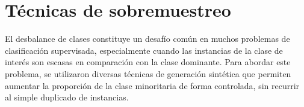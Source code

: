 \section{Técnicas de sobremuestreo}

El desbalance de clases constituye un desafío común en muchos problemas de clasificación supervisada, especialmente cuando las instancias de la clase de interés son escasas en comparación con la clase dominante. Para abordar este problema, se utilizaron diversas técnicas de generación sintética que permiten aumentar la proporción de la clase minoritaria de forma controlada, sin recurrir al simple duplicado de instancias.

